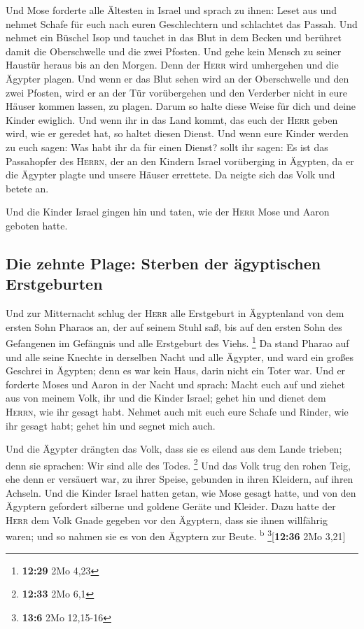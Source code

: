  Und Mose forderte alle Ältesten in Israel und sprach zu
ihnen: Leset aus und nehmet Schafe für euch nach euren Geschlechtern und
schlachtet das Passah.  Und nehmet ein Büschel Isop und
tauchet in das Blut in dem Becken und berühret damit die Oberschwelle
und die zwei Pfosten. Und gehe kein Mensch zu seiner Haustür heraus bis
an den Morgen.  Denn der \textsc{Herr} wird umhergehen
und die Ägypter plagen. Und wenn er das Blut sehen wird an der
Oberschwelle und den zwei Pfosten, wird er an der Tür vorübergehen und
den Verderber nicht in eure Häuser kommen lassen, zu plagen.
 Darum so halte diese Weise für dich und deine Kinder
ewiglich.  Und wenn ihr in das Land kommt, das euch der
\textsc{Herr} geben wird, wie er geredet hat, so haltet diesen Dienst.
 Und wenn eure Kinder werden zu euch sagen: Was habt ihr
da für einen Dienst?  sollt ihr sagen: Es ist das
Passahopfer des \textsc{Herrn}, der an den Kindern Israel vorüberging in
Ägypten, da er die Ägypter plagte und unsere Häuser errettete. Da neigte
sich das Volk und betete an.

 Und die Kinder Israel gingen hin und taten, wie der
\textsc{Herr} Mose und Aaron geboten hatte.

\hypertarget{die-zehnte-plage-sterben-der-uxe4gyptischen-erstgeburten}{%
\subsection{Die zehnte Plage: Sterben der ägyptischen
Erstgeburten}\label{die-zehnte-plage-sterben-der-uxe4gyptischen-erstgeburten}}

 Und zur Mitternacht schlug der \textsc{Herr} alle
Erstgeburt in Ägyptenland von dem ersten Sohn Pharaos an, der auf seinem
Stuhl saß, bis auf den ersten Sohn des Gefangenen im Gefängnis und alle
Erstgeburt des Viehs. \footnote{\textbf{12:29} 2Mo 4,23} 
Da stand Pharao auf und alle seine Knechte in derselben Nacht und alle
Ägypter, und ward ein großes Geschrei in Ägypten; denn es war kein Haus,
darin nicht ein Toter war.  Und er forderte Moses und
Aaron in der Nacht und sprach: Macht euch auf und ziehet aus von meinem
Volk, ihr und die Kinder Israel; gehet hin und dienet dem
\textsc{Herrn}, wie ihr gesagt habt.  Nehmet auch mit
euch eure Schafe und Rinder, wie ihr gesagt habt; gehet hin und segnet
mich auch.

 Und die Ägypter drängten das Volk, dass sie es eilend
aus dem Lande trieben; denn sie sprachen: Wir sind alle des Todes.
\footnote{\textbf{12:33} 2Mo 6,1}  Und das Volk trug den
rohen Teig, ehe denn er versäuert war, zu ihrer Speise, gebunden in
ihren Kleidern, auf ihren Achseln.  Und die Kinder Israel
hatten getan, wie Mose gesagt hatte, und von den Ägyptern gefordert
silberne und goldene Geräte und Kleider.  Dazu hatte der
\textsc{Herr} dem Volk Gnade gegeben vor den Ägyptern, dass sie ihnen
willfährig waren; und so nahmen sie es von den Ägyptern zur Beute.
\textsuperscript{b} \footnote{\textbf{13:6} 2Mo 12,15-16}{[}\textbf{12:36}
2Mo 3,21{]}

